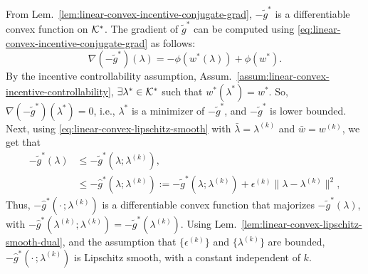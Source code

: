 From Lem.~\ref{lem:linear-convex-incentive-conjugate-grad}, $-\tilde{g}^*$ is a differentiable convex function on $\mathcal{K}^*$.
The gradient of $\tilde{g}^*$ can be computed using \eqref{eq:linear-convex-incentive-conjugate-grad} as follows:
\begin{equation*}
    \nabla (-\tilde{g}^*)(\lambda) = -\phi(w^*(\lambda)) + \phi(w^*).
\end{equation*}
By the incentive controllability assumption, Assum.~\ref{assum:linear-convex-incentive-controllability}, $\exists \lambda^* \in \mathcal{K}^*$ such that $w^*(\lambda^*) = w^*$.
So, $\nabla (-\tilde{g}^*)(\lambda^*) = 0$, i.e., $\lambda^*$ is a minimizer of $-\tilde{g}^*$, and $-\tilde{g}^*$ is lower bounded.
Next, using \eqref{eq:linear-convex-lipschitz-smooth} with $\bar{\lambda} = \lambda^{(k)}$ and $\bar{w} = w^{(k)}$, we get that
\begin{align}
\label{eq:linear-convex-incentive-iterative-method-proof-majorization}
    -\tilde{g}^*(\lambda) & \leq -\tilde{g}^*(\lambda; \lambda^{(k)}), \\
    & \leq -\hat{g}^*(\lambda; \lambda^{(k)}) := -\tilde{g}^*(\lambda; \lambda^{(k)}) + \epsilon^{(k)} \lVert \lambda - \lambda^{(k)} \rVert^2, \nonumber
\end{align}
Thus, $-\hat{g}^*(\cdot \,; \lambda^{(k)})$ is a differentiable convex function that majorizes $-\tilde{g}^*(\lambda)$, with $-\hat{g}^*(\lambda^{(k)}; \lambda^{(k)}) = -\tilde{g}^*(\lambda^{(k)})$.
Using Lem.~\ref{lem:linear-convex-lipschitz-smooth-dual}, and the assumption that $\{\epsilon^{(k)}\}$ and $\{\lambda^{(k)} \}$ are bounded, $-\hat{g}^*(\cdot \,; \lambda^{(k)})$ is Lipschitz smooth, with a constant independent of $k$.
